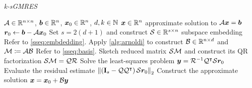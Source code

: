 \begin{algorithm}
    \caption{\textit{k-sGMRES}} \label{alg:sgmres}
    \begin{algorithmic}
    \Require $\mathcal{A} \in \mathbb{R}^{n \times n}$, $\bm{b} \in \mathbb{R}^{n}$, $\bm{x}_0 \in \mathbb{R}^{n}$, $d, k \in \mathbb{N}$
    \Ensure $\bm{x} \in \mathbb{R}^{n}$ approximate solution to $\mathcal{A} \bm{x} = \bm{b}$
    \State $\bm{r}_0 \gets \bm{b} - \mathcal{A} \bm{x}_0$
    \State Set $s = 2 (d + 1)$ and construct $\mathcal{S} \in \mathbb{R}^{s \times n}$ subspace embedding \Comment Refer to \cref{sseq:embdedding}.
    \State Apply \cref{alg:arnoldi} to construct $\mathcal{B} \in \mathbb{R}^{n \times d}$ and $\mathcal{M} \coloneqq \mathcal{A} \mathcal{B}$ \Comment Refer to \cref{sseq:basis}.
    \State Sketch reduced matrix $\mathcal{S} \mathcal{M}$ and construct its QR factorization $\mathcal{S} \mathcal{M} = \mathcal{Q} \mathcal{R}$
    \State Solve the least-squares problem $\bm{y} = \mathcal{R}^{-1} \mathcal{Q}^{\intercal} \mathcal{S} \bm{r}_0$
    \State Evaluate the residual estimate $\left\lVert  \left( \mathbf{I}_s - \mathcal{Q} \mathcal{Q}^{\intercal} \right) \mathcal{S} \bm{r}_0  \right\rVert_2$
    \State Construct the approximate solution $\bm{x} = \bm{x}_0 + \mathcal{B} \bm{y}$
    \end{algorithmic}
    \end{algorithm}